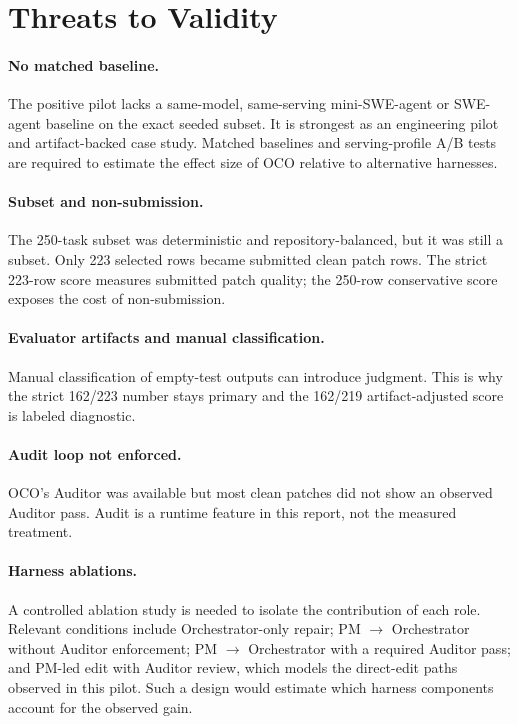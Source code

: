 \documentclass[11pt]{article}
\begin{document}
\section{Threats to Validity}

\paragraph{No matched baseline.}
The positive pilot lacks a same-model, same-serving mini-SWE-agent or SWE-agent baseline on the exact seeded subset. It is strongest as an engineering pilot and artifact-backed case study. Matched baselines and serving-profile A/B tests are required to estimate the effect size of OCO relative to alternative harnesses.

\paragraph{Subset and non-submission.}
The 250-task subset was deterministic and repository-balanced, but it was still a subset. Only 223 selected rows became submitted clean patch rows. The strict 223-row score measures submitted patch quality; the 250-row conservative score exposes the cost of non-submission.

\paragraph{Evaluator artifacts and manual classification.}
Manual classification of empty-test outputs can introduce judgment. This is why the strict 162/223 number stays primary and the 162/219 artifact-adjusted score is labeled diagnostic.

\paragraph{Audit loop not enforced.}
OCO's Auditor was available but most clean patches did not show an observed Auditor pass. Audit is a runtime feature in this report, not the measured treatment.

\paragraph{Harness ablations.}
A controlled ablation study is needed to isolate the contribution of each role. Relevant conditions include Orchestrator-only repair; PM $\rightarrow$ Orchestrator without Auditor enforcement; PM $\rightarrow$ Orchestrator with a required Auditor pass; and PM-led edit with Auditor review, which models the direct-edit paths observed in this pilot. Such a design would estimate which harness components account for the observed gain.
\end{document}
